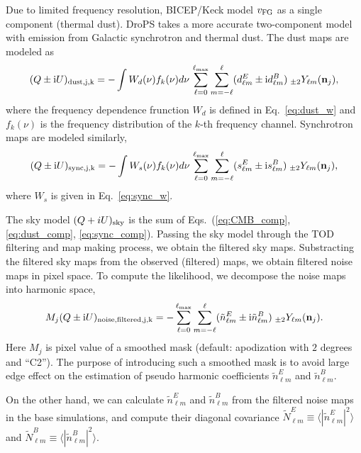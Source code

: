 \documentclass[12pt, a4paper]{ctexart} %
\begin{document}
Due to limited frequency resolution, BICEP/Keck model $v_{\rm FG}$ as a single component (thermal dust). DroPS takes a more accurate two-component model with emission from Galactic synchrotron and thermal dust. The dust maps are modeled as
\begin{equation}
  (Q\pm \mathrm{i}U)_{\rm dust, j, k} =  -\int W_d(\nu) f_k(\nu) d\nu \,\sum_{\ell = 0}^{\ell_{\max}}\sum_{m=-\ell}^\ell (d_{\ell m}^E\pm \mathrm{i}  d_{\ell m}^B)\;_{\pm 2}Y_{\ell m}(\mathbf{n}_j),  \label{eq:dust_comp}
\end{equation}
where the frequency dependence frunction $W_d$ is defined in Eq.~\eqref{eq:dust_w} and $f_k(\nu)$ is the frequency distribution of the $k$-th frequency channel.
Synchrotron maps are modeled similarly,
\begin{equation}
  (Q\pm \mathrm{i}U)_{\rm sync, j, k} =  -\int W_s(\nu) f_k(\nu) d\nu \,\sum_{\ell = 0}^{\ell_{\max}}\sum_{m=-\ell}^\ell (s_{\ell m}^E\pm \mathrm{i}  s_{\ell m}^B)\;_{\pm 2}Y_{\ell m}(\mathbf{n}_j),  \label{eq:sync_comp}
\end{equation}
where $W_s$ is given in Eq.~\eqref{eq:sync_w}.

The sky model $(Q+iU)_{\rm sky}$ is the sum of Eqs.~(\ref{eq:CMB_comp}, \ref{eq:dust_comp}, \ref{eq:sync_comp}). Passing the sky model through the TOD filtering and map making process, we obtain the filtered sky maps. Substracting the filtered sky maps from the observed (filtered) maps, we obtain filtered noise maps in pixel space. To compute the likelihood, we decompose the noise maps into harmonic space,
\begin{equation}
   M_j(Q\pm \mathrm{i}U)_{\rm noise, filtered, j, k} = -\sum_{\ell = 0}^{\ell_{\max}}\sum_{m=-\ell}^\ell (\tilde{n}_{\ell m}^E\pm \mathrm{i} \tilde{n}_{\ell m}^B)\;_{\pm 2}Y_{\ell m}(\mathbf{n}_j).
\end{equation}
Here $M_j$ is pixel value of a smoothed mask (default: apodization with $2$ degrees and ``C2''). The purpose of introducing such a smoothed mask is to avoid large edge effect on the estimation of pseudo harmonic coefficients $\tilde{n}_{\ell m}^E$ and $\tilde{n}_{\ell m}^B$.

On the other hand, we can calculate $\tilde{n}_{\ell m}^E$ and $\tilde{n}_{\ell m}^B$ from the filtered noise maps in the base simulations, and compute their diagonal covariance $\tilde{N}^E_{\ell m} \equiv \langle |\tilde{n}_{\ell m}^E|^2\rangle $ and $\tilde{N}^B_{\ell m} \equiv \langle |\tilde{n}_{\ell m}^B|^2\rangle $.




 
\end{document}
